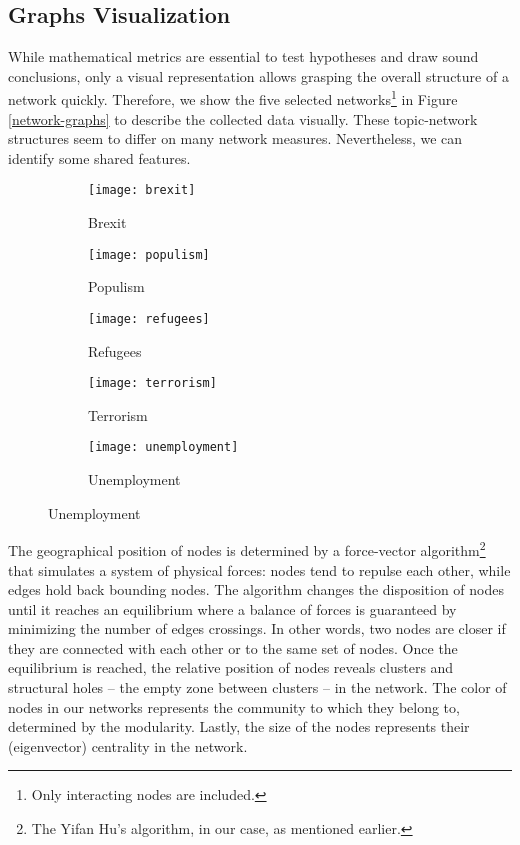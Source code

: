 \subsection{Graphs Visualization}
While mathematical metrics are essential to test hypotheses and draw sound conclusions, only a visual representation allows grasping the overall structure of a network quickly. Therefore, we show the five selected networks\footnote{Only interacting nodes are included.} in Figure \vref{network-graphs} to describe the collected data visually. These topic-network structures seem to differ on many network measures. Nevertheless, we can identify some shared features.
\begin{figure}[t]
  \caption{Network graphs per topic.}\label{network-graphs}
  \begin{subfigure}[t]{.33\textwidth}
    \centering
    \texttt{[image: brexit]}
    \caption{Brexit}
  \end{subfigure}%
  \begin{subfigure}[t]{.33\textwidth}
    \centering
    \texttt{[image: populism]}
    \caption{Populism}
  \end{subfigure}
  \begin{subfigure}[t]{.33\textwidth}
    \centering
    \texttt{[image: refugees]}
    \caption{Refugees}
  \end{subfigure}
  \newline
  \begin{subfigure}[t]{.5\textwidth}
    \centering
    \texttt{[image: terrorism]}
    \caption{Terrorism}
  \end{subfigure}%
  \begin{subfigure}[t]{.5\textwidth}
    \centering
    \texttt{[image: unemployment]}
    \caption{Unemployment}
  \end{subfigure}
\end{figure}

The geographical position of nodes is determined by a force-vector algorithm\footnote{The Yifan Hu's algorithm, in our case, as mentioned earlier.} that simulates a system of physical forces: nodes tend to repulse each other, while edges hold back bounding nodes. The algorithm changes the disposition of nodes until it reaches an equilibrium where a balance of forces is guaranteed by minimizing the number of edges crossings. In other words, two nodes are closer if they are connected with each other or to the same set of nodes. Once the equilibrium is reached, the relative position of nodes reveals clusters and structural holes – the empty zone between clusters –  in the network. The color of nodes in our networks represents the community to which they belong to, determined by the modularity. Lastly, the size of the nodes represents their (eigenvector) centrality in the network.

